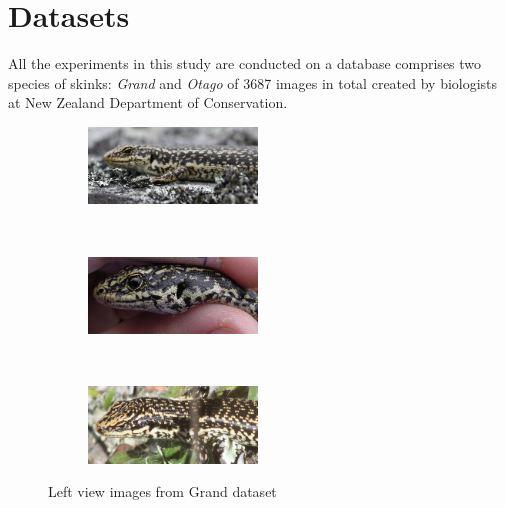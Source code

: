 \graphicspath{{./images/chap3/}}
\chapter{Datasets} %
\label{cha:datasets}

All the experiments in this study are conducted on a database comprises two
species of skinks: \emph{Grand} and \emph{Otago} of 3687 images in total
created by biologists at New Zealand Department of Conservation.

\begin{figure}[htb]
  \centering
  \begin{subfigure}[t]{0.31\textwidth}
      \centering
      \includegraphics[width=4.5cm]{dataset/general/grand_L3}
  \end{subfigure}
  ~
  \begin{subfigure}[t]{0.31\textwidth}
      \centering
      \includegraphics[width=4.5cm]{dataset/general/grand_L1}
  \end{subfigure}
  ~
  \begin{subfigure}[t]{0.31\textwidth}
      \centering
      \includegraphics[width=4.5cm]{dataset/general/grand_L2}
  \end{subfigure}
  \captionsetup{justification=centering}
  \caption{Left view images from Grand dataset}
  \label{fig:grand_left} %
\end{figure}


